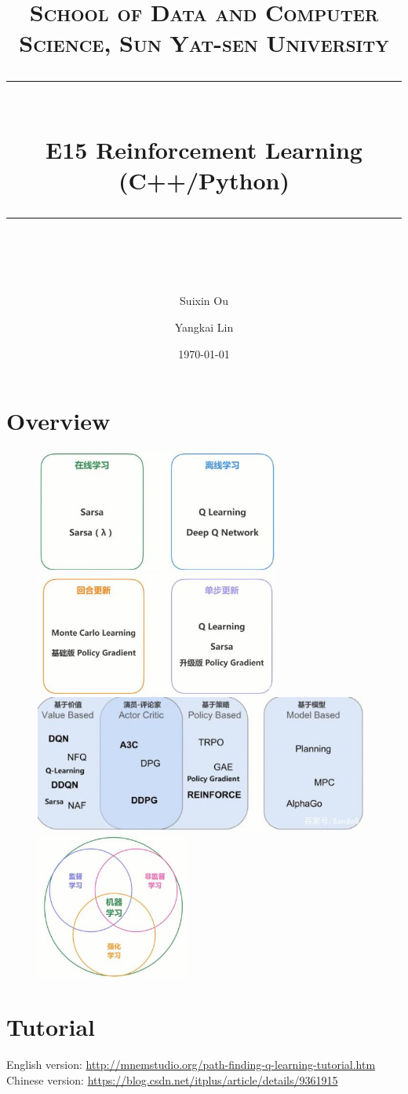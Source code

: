 \documentclass[a4paper, 11pt]{article}
\title{	
\normalfont \normalsize
\textsc{School of Data and Computer Science, Sun Yat-sen University} \\ [25pt] %
\rule{\textwidth}{0.5pt} \\[0.4cm] %
\huge  E15 Reinforcement Learning (C++/Python)\\ %
\rule{\textwidth}{2pt} \\[0.5cm] %
\author{Suixin Ou \and Yangkai Lin}
\date{\normalsize\today}
}
\begin{document}
\maketitle
\tableofcontents
\newpage
\section{Overview}
\begin{figure}[ht]
\centering
\includegraphics[width=8cm]{Pic/on_off}
\quad
\includegraphics[width=8cm]{Pic/update}
\includegraphics[width=11cm]{Pic/base}
\quad
\includegraphics[width=5cm]{Pic/relation}
\end{figure}
\section{Tutorial}
English version: \url{http://mnemstudio.org/path-finding-q-learning-tutorial.htm}\\
Chinese version: \url{https://blog.csdn.net/itplus/article/details/9361915}
\end{document}

